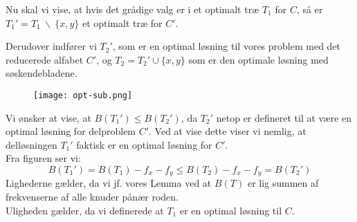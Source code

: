 Nu skal vi vise, at hvis det grådige valg er i et optimalt træ $T_1$ for $C$, så er $T_1' = T_1 \ \backslash \ \{x, y\}$ et optimalt træ for $C'$.

Derudover indfører vi $T_2'$, som er en optimal løsning til vores problem med det reducerede alfabet $C'$, og $T_2 = T_2' \cup \{x, y\}$ som er den optimale løsning med søskendebladene. 
\begin{figure}[H]
	\begin{center}
		\texttt{[image: opt-sub.png]}
	\end{center}
	\label{fig:opt-sub}
\end{figure}

Vi ønsker at vise, at $B(T_1') \leq B(T_2')$, da $T_2'$ netop er defineret til at være en optimal løsning for delproblem $C'$. Ved at vise dette viser vi nemlig, at delløsningen $T_1'$ faktisk er en optimal løsning for $C'$.\\

Fra figuren ser vi:
$$
B(T_1') = B(T_1) - f_x - f_y \leq B(T_2) - f_x - f_y = B(T_2')
$$
Lighederne gælder, da vi jf. vores Lemma ved at $B(T)$ er lig summen af frekvenserne af alle knuder pånær roden.\\

Uligheden gælder, da vi definerede at $T_1$ er en optimal løsning til $C$.\\


